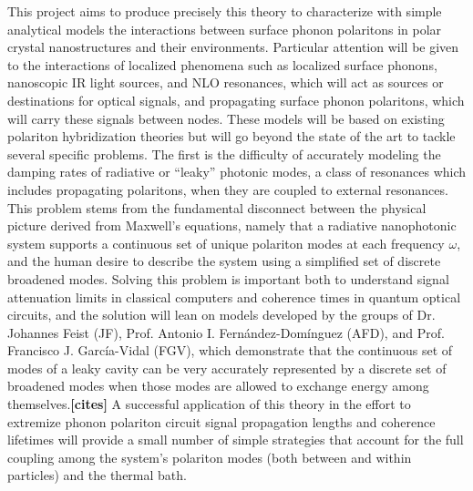 \documentclass[11pt,a4paper]{article}
\begin{document}
This project aims to produce precisely this theory to characterize with simple analytical models the interactions between surface phonon polaritons in polar crystal nanostructures and their environments. Particular attention will be given to the interactions of localized phenomena such as localized surface phonons, nanoscopic IR light sources, and NLO resonances, which will act as sources or destinations for optical signals, and propagating surface phonon polaritons, which will carry these signals between nodes. These models will be based on existing polariton hybridization theories but will go beyond the state of the art to tackle several specific problems. The first is the difficulty of accurately modeling the damping rates of radiative or ``leaky'' photonic modes, a class of resonances which includes propagating polaritons, when they are coupled to external resonances. This problem stems from the fundamental disconnect between the physical picture derived from Maxwell's equations, namely that a radiative nanophotonic system supports a continuous set of unique polariton modes at each frequency $\omega$, and the human desire to describe the system using a simplified set of discrete broadened modes. Solving this problem is important both to understand signal attenuation limits in classical computers and coherence times in quantum optical circuits, and the solution will lean on models developed by the groups of Dr. Johannes Feist (JF), Prof. Antonio I. Fern\'{a}ndez-Dom\'{i}nguez (AFD), and Prof. Francisco J. Garc\'{i}a-Vidal (FGV), which demonstrate that the continuous set of modes of a leaky cavity can be very accurately represented by a discrete set of broadened modes when those modes are allowed to exchange energy among themselves.\textbf{[cites]} A successful application of this theory in the effort to extremize phonon polariton circuit signal propagation lengths and coherence lifetimes will provide a small number of simple strategies that account for the full coupling among the system's polariton modes (both between and within particles) and the thermal bath.
\end{document}
